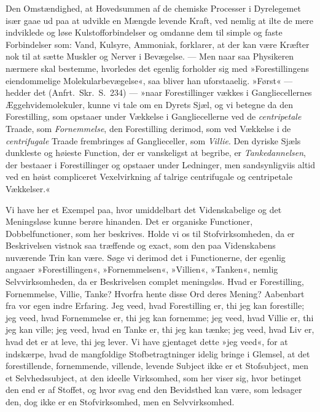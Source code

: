 \documentclass[12pt]{book}
\newcommand{\apage}[1]{\marginnote{\footnotesize\textit{[#1]}}}
\begin{document}
Den Omstændighed, at Hovedsummen af de chemiske Processer i Dyrelegemet
især gaae ud paa at udvikle en Mængde levende Kraft, ved nemlig at ilte de
mere indviklede og løse Kulstofforbindelser og omdanne dem til simple og
faste Forbindelser som: Vand, Kulsyre, Ammoniak, forklarer, at der kan være
Kræfter nok til at sætte Muskler og Nerver i Bevægelse. --- Men naar saa
Physikeren nærmere skal bestemme, \apage{193} hvorledes det egenlig forholder sig med
»Forestillingens eiendommelige Molekularbevægelse«, saa bliver han
uforstaaelig. »Først« --- hedder det (Anfrt.\ Skr.\ S.\ 234) --- »naar
Forestillinger vækkes i Gangliecellernes Æggehvidemolekuler, kunne vi tale
om en Dyrets Sjæl, og vi betegne da den Forestilling, som opstaaer under
Vækkelse i Gangliecellerne ved de \emph{centripetale} Traade, som \emph{Fornemmelse}, den
Forestilling derimod, som ved Vækkelse i de \emph{centrifugale} Traade frembringes
af Ganglieceller, som \emph{Villie}. Den dyriske Sjæls dunkleste og høieste
Function, der er vanskeligst at begribe, er \emph{Tankedannelsen}, der bestaaer i
Forestillinger og opstaaer under Ledninger, men sandsynligviis altid ved en
høist compliceret Vexelvirkning af talrige centrifugale og centripetale
Vækkelser.«

Vi have her et Exempel paa, hvor umiddelbart det Videnskabelige og det
Meningsløse kunne berøre hinanden. Det er organiske Functioner,
Dobbelfunctioner, som her beskrives. Holde vi os til Stofvirksomheden, da
er Beskrivelsen vistnok saa træffende og exact, som den paa Videnskabens
nuværende Trin kan være. Søge vi derimod det i Functionerne, der egenlig
angaaer »Forestillingen«, »Fornemmelsen«, »Villien«, »Tanken«, nemlig
Selvvirksomheden, da er Beskrivelsen complet meningsløs. Hvad er
Forestilling, Fornemmelse, Villie, Tanke? Hvorfra hente disse Ord deres
Mening? Aabenbart fra vor egen indre Erfaring. Jeg veed, hvad Forestilling
er, thi jeg kan forestille; jeg veed, hvad Fornemmelse er, thi jeg kan
fornemme; jeg veed, hvad Villie er, thi jeg kan ville; jeg veed, hvad en
\apage{194} Tanke er, thi jeg kan tænke; jeg veed, hvad Liv er, hvad det er at leve,
thi jeg lever. Vi have gjentaget dette »jeg veed«, for at indskærpe, hvad
de mangfoldige Stofbetragtninger idelig bringe i Glemsel, at det
forestillende, fornemmende, villende, levende Subject ikke er et
Stofsubject, men et Selvhedssubject, at den ideelle Virksomhed, som her
viser sig, hvor betinget den end er af Stoffet, og hvor svag end den
Bevidsthed kan være, som ledsager den, dog ikke er en Stofvirksomhed, men
en Selvvirksomhed.
\end{document}
